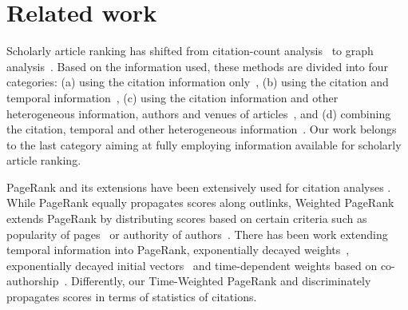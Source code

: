 
\section{Related work} \label{sec-related}



Scholarly article ranking has shifted from citation-count analysis~\cite{Garfield471,Hirsch15112005} to graph analysis~\cite{Waltman2014,Jiang12-MRank,Liang16AAAI,Li08TSRanking,Wang13AAAI,WalkerXKM07,sayyadi09,
Wang16TIST,Ng11KDD}.
Based on the information used, these methods are divided into four categories: (a) using the citation information only~\cite{Garfield471,Hirsch15112005,Ng11KDD}, (b) using the citation and temporal information~\cite{Li08TSRanking,WalkerXKM07}, (c) using the citation information and other heterogeneous information, \eg authors and venues of articles~\cite{Jiang12-MRank,Liang16AAAI}, and (d) combining the citation, temporal and other heterogeneous information~\cite{sayyadi09,Wang16TIST,Wang13AAAI}.
Our work belongs to the last category aiming at fully employing information available for scholarly article ranking.
%



PageRank \cite{Brin98:PageRank} and its extensions have been extensively used for citation analyses \cite{Waltman2014}. While PageRank equally propagates scores along outlinks, Weighted PageRank extends PageRank by distributing scores based on certain criteria such as popularity of pages~\cite{Xing04:WPR} or authority of authors~\cite{Ding11}.
There has been work extending temporal information into PageRank, \eg exponentially decayed weights~\cite{Li08TSRanking}, exponentially decayed initial vectors~\cite{WalkerXKM07} and time-dependent weights based on co-authorship~\cite{FIALA2012370}. 
Differently, our Time-Weighted PageRank  and discriminately propagates scores in terms of statistics of citations.


